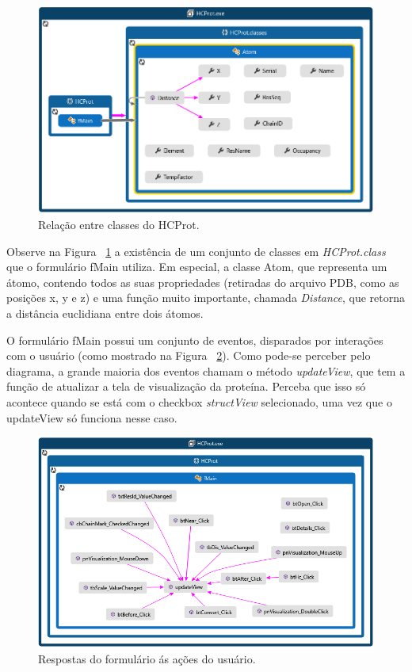 \begin{figure}[H]
	\begin{center}
		\includegraphics[width=0.95\linewidth]{secProteins/figures/classDiagram.png}
	\end{center}
	\caption{Relação entre classes do HCProt.}
	\label{fig:classDiagram}
\end{figure}

Observe na Figura ~\ref{fig:classDiagram} a existência de um conjunto de classes em \textit{HCProt.class} que o formulário fMain utiliza. Em especial, a classe Atom, que representa um átomo, contendo todos as suas propriedades (retiradas do arquivo PDB, como as posições x, y e z) e uma função muito importante, chamada \textit{Distance}, que retorna a distância euclidiana entre dois átomos.

O formulário fMain possui um conjunto de eventos, disparados por interações com o usuário (como mostrado na Figura ~\ref{fig:fmain}). Como pode-se perceber pelo diagrama, a grande maioria dos eventos chamam o método \textit{updateView}, que tem a função de atualizar a tela de visualização da proteína. Perceba que isso só acontece quando se está com o checkbox \textit{structView} selecionado, uma vez que o updateView só funciona nesse caso.

\begin{figure}[H]
	\begin{center}
		\includegraphics[width=0.95\linewidth]{secProteins/figures/fmainClassDiagram.png}
	\end{center}
	\caption{Respostas do formulário ás ações do usuário.}
	\label{fig:fmain}
\end{figure}

